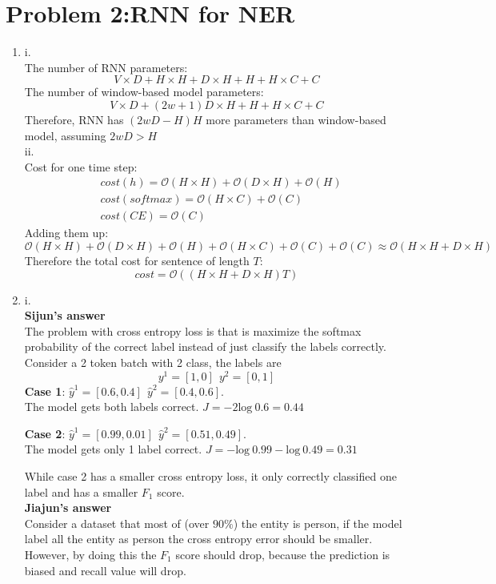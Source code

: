 \documentclass[10pt]{article}
\begin{document}
\section*{Problem 2:RNN for NER}
\begin{enumerate}[label=(\alph*)]
\item
i.\\
The number of RNN parameters:
$$
V \times D + H \times H + D \times H + H + H \times C + C
$$
The number of window-based model parameters:
$$
V \times D + (2w+1)D \times H + H + H \times C + C
$$
Therefore, RNN has $(2wD - H)H$ more parameters than window-based model, assuming $2wD > H$\\

ii.\\
Cost for one time step:
$$
\begin{aligned}
& cost(h) = \mathcal{O}(H \times H) + \mathcal{O}(D \times H) + \mathcal{O}(H)\\
& cost(softmax) = \mathcal{O}(H \times C) + \mathcal{O}(C)\\
& cost(CE) = \mathcal{O}(C)
\end{aligned}
$$
Adding them up:
$$
\mathcal{O}(H \times H) + \mathcal{O}(D \times H) + \mathcal{O}(H) + \mathcal{O}(H \times C) + \mathcal{O}(C) + \mathcal{O}(C) \approx \mathcal{O}(H \times H + D \times H)
$$
Therefore the total cost for sentence of length $T$:
$$
cost =  \mathcal{O}((H \times H + D \times H)T)
$$

\item
i.\\
\textbf{Sijun's answer}\\
The problem with cross entropy loss is that is maximize the softmax probability of the correct label instead of just classify the labels correctly. Consider a 2 token batch with 2 class, the labels are
$$y^{1} = [1, 0] \ \  y^{2} = [0, 1]$$
\textbf{Case 1}: $\hat{y}^{1} = [0.6, 0.4] \ \ \hat{y}^{2} = [0.4, 0.6]$. \\
The model gets both labels correct. $J = -2\text{log} \ 0.6 = 0.44$\par
\textbf{Case 2}: $\hat{y}^{1} = [0.99, 0.01] \ \ \hat{y}^{2} = [0.51, 0.49]$.\\ 
The model gets only 1 label correct. $J = -\text{log} \ 0.99 -\text{log} \ 0.49 = 0.31$\par
While case 2 has a smaller cross entropy loss, it only correctly classified one label and has a smaller $F_1$ score.\\
\textbf{Jiajun's answer}\\
Consider a dataset that most of (over $90\%$) the entity is person,
if the model label all the entity as person the cross entropy error should be smaller.
However, by doing this the $F_1$ score should drop, because the prediction is biased and recall value will drop.


\end{enumerate}
\end{document}
